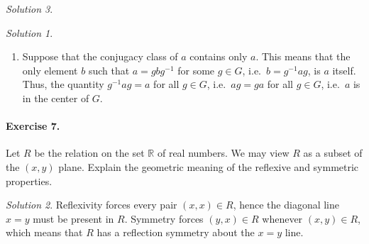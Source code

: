 \documentclass[11pt]{report}
\def\R{\mathbb{R}}
\theoremstyle{remark}
\newtheorem*{solution}{Solution}
\begin{document}
\begin{solution}
\begin{solution}
\begin{enumerate}
        \item Suppose that the conjugacy class of $a$ contains only $a$. This means
        that the only element $b$ such that $a = gbg^{-1}$ for some $g \in G$, i.e.\
        $b = g^{-1}ag$, is $a$ itself. Thus, the quantity $g^{-1}ag = a$ for all $g
        \in G$, i.e.\ $ag = ga$ for all $g \in G$, i.e.\ $a$ is in the center of
        $G$.
    \end{enumerate}
    \end{solution}
    
    \paragraph{Exercise 7.} Let $R$ be the relation on the set $\R$ of real numbers.
    We may view $R$ as a subset of the $(x, y)$ plane. Explain the geometric meaning
    of the reflexive and symmetric properties.
    \begin{solution}
        Reflexivity forces every pair $(x, x) \in R$, hence the diagonal line $x =
        y$ must be present in $R$. Symmetry forces $(y, x) \in R$ whenever $(x, y)
        \in R$, which means that $R$ has a reflection symmetry about the $x = y$
        line.
    \end{solution}
    

\end{solution}
\end{document}
